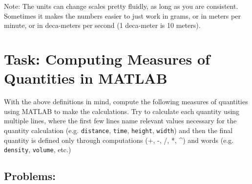 \documentclass{ximera}
\begin{document}
\begin{remark}
Note: The units can change scales pretty fluidly, as long as you are consistent. Sometimes it makes the numbers easier to just work in grams, or in meters per minute, or in deca-meters per second (1 deca-meter is 10 meters).
\end{remark}

\section*{Task: Computing Measures of Quantities in MATLAB}

With the above definitions in mind, compute the following measures of quantities using MATLAB to make the calculations. Try to calculate each quantity using multiple lines, where the first few lines name relevant values necessary for the quantity calculation (e.g. \texttt{distance}, \texttt{time}, \texttt{height}, \texttt{width}) and then the final quantity is defined only through computations (+, -, /, *, \^{}) and words (e.g. \texttt{density}, \texttt{volume}, etc.)

\subsection*{Problems:}
\end{document}
